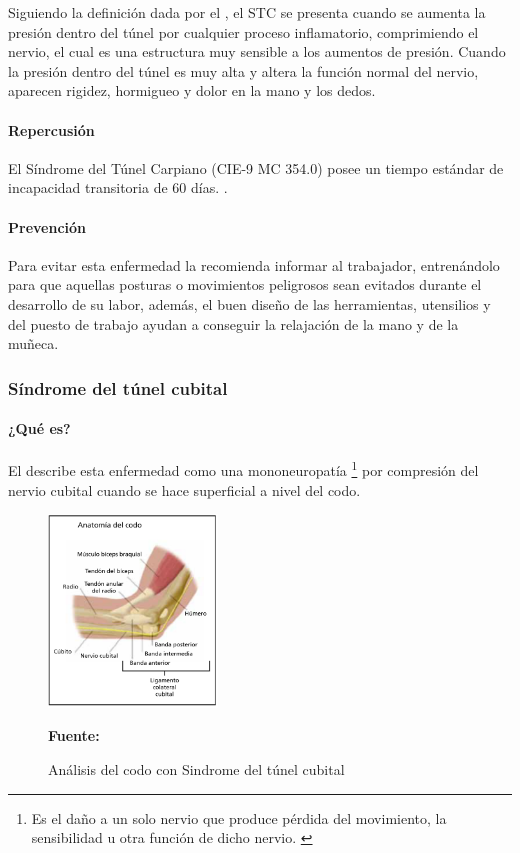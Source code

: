 Siguiendo la definición dada por el \parencite{INSHT2017SindromeCarpiano}, el STC se presenta cuando se aumenta la presión dentro del túnel por cualquier proceso inflamatorio, comprimiendo el nervio, el cual es una estructura muy sensible a los aumentos de presión. Cuando la presión dentro del túnel es muy alta y altera la función normal del nervio, aparecen rigidez, hormigueo y dolor en la mano y los dedos.
\paragraph{Repercusión}
El Síndrome del Túnel Carpiano (CIE-9 MC 354.0) posee un tiempo estándar de incapacidad transitoria de 60 días. \parencite[6]{INSHT2017SindromeCarpiano}.
\paragraph{Prevención}
Para evitar esta enfermedad la \parencite{FundacionSantaFedeBogota2016SindromeTratarlo} recomienda informar al trabajador, entrenándolo para que aquellas posturas o movimientos peligrosos sean evitados durante el desarrollo de su labor, además, el buen diseño de las herramientas, utensilios y del puesto de trabajo ayudan a conseguir la relajación de la mano y de la muñeca.
\newpage
\subsubsection{Síndrome del túnel cubital}
\paragraph{¿Qué es?}
El \parencite[1]{INSHT2017SindromeCodo} describe esta enfermedad como una mononeuropatía \footnote{Es el daño a un solo nervio que produce pérdida del movimiento, la sensibilidad u otra función de dicho nervio.  \parencite{MedlinePlus2018Mononeuropatia}} por compresión del nervio cubital cuando se hace superficial a nivel del codo.
\begin{figure}[H]
    \centering
    \includegraphics[width=0.4\textwidth]{Anexos/LATEX/chapters/images/AnaCodo.png}
    \caption{Análisis del codo con Sindrome del túnel cubital}
    \small{\textbf{Fuente:} \parencite[1]{INSHT2017SindromeCodo}}
    \label{AnaCodo}
\end{figure}
